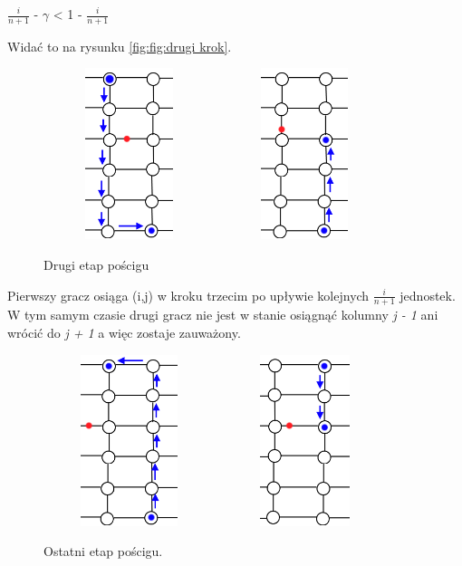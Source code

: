 \documentclass[brudnopis]{xmgr}
\begin{document}
\begin{center}
$\frac{i}{n+1}$ - $\gamma$ < 1 - $\frac{i}{n+1}$
\end{center}
Widać to na rysunku \ref{fig:fig:drugi krok}.
\begin{figure}[ht!]
  \centering
  \includegraphics[width=5cm,height=5cm]{rysunki/poscig_2.png}
  \includegraphics[width=5cm,height=5cm]{rysunki/poscig_3.png}
  \caption{Drugi etap pościgu}
  \label{fig:drugi krok}
\end{figure}

\indent Pierwszy gracz osiąga (i,j) w kroku trzecim po upływie kolejnych $\frac{i}{n+1}$ jednostek. W tym samym czasie drugi gracz nie jest w stanie osiągnąć kolumny \textit{j - 1} ani wrócić do \textit{j + 1} a więc zostaje zauważony.
\begin{figure}[ht!]
  \centering
  \includegraphics[width=5cm,height=5cm]{rysunki/poscig_4.png}
  \includegraphics[width=5cm,height=5cm]{rysunki/poscig_5.png}
  \caption{Ostatni etap pościgu.}
  \label{fig:ostatni etap poscigu}
\end{figure} 
\end{document}
